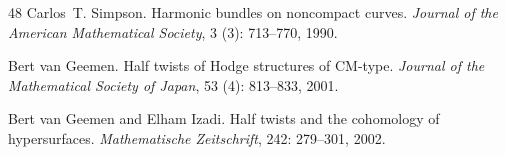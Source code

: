 \documentclass[11pt]{amsart}
\theoremstyle{definition}
\theoremstyle{remark}
\numberwithin{equation}{section}
\begin{document}
\begin{thebibliography}{48}
Carlos~T. Simpson.
\newblock Harmonic bundles on noncompact curves.
\newblock \emph{Journal of the American Mathematical Society}, 3
  (3): 713--770, 1990.

Bert van Geemen.
\newblock Half twists of {H}odge structures of {CM}-type.
\newblock \emph{Journal of the Mathematical Society of Japan}, 53
  (4): 813--833, 2001.

Bert van Geemen and Elham Izadi.
\newblock Half twists and the cohomology of hypersurfaces.
\newblock \emph{Mathematische Zeitschrift}, 242: 279--301, 2002.

\end{thebibliography}
\end{document}
